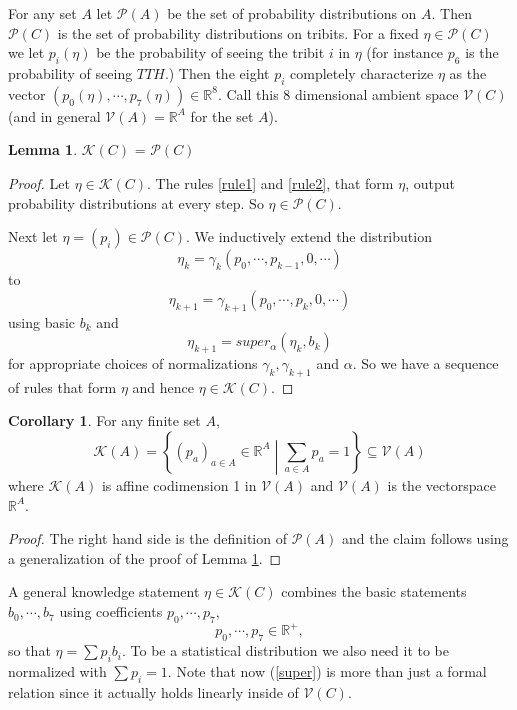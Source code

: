 \documentclass[12pt,a4paper]{article}
\theoremstyle{myrule}
\theoremstyle{postulate}
\theoremstyle{definition}
\newtheorem{corollary}{Corollary}[theorem]
\newtheorem{lemma}[theorem]{Lemma}
\begin{document}
For any set $A$ let $\mathcal{P}(A)$ be the set of probability distributions on $A$.  Then $\mathcal{P}(C)$ is the set of probability distributions on tribits. For a fixed $\eta \in \mathcal{P}(C)$ we let $p_i(\eta)$ be the probability of seeing the tribit $i$ in $\eta$ (for instance $p_\mathit{6}$ is the probability of seeing $TTH$.)  Then the eight $p_i$ completely characterize $\eta$ as the vector $(p_\mathit{0}(\eta),\cdots,p_\mathit{7}(\eta)) \in \mathbb{R}^8$.  Call this 8 dimensional ambient space $\mathcal{V}(C)$ (and in general $\mathcal{V}(A) = \mathbb{R}^A$ for the set $A$).
\begin{lemma}
\label{prob}
  $\mathcal{K}(C)$ = $\mathcal{P}(C)$
\end{lemma}
\begin{proof}
  Let $\eta \in \mathcal{K}(C)$.  The rules \ref{rule1} and \ref{rule2}, that form $\eta$, output probability distributions at every step.  So $\eta \in \mathcal{P}(C)$.
  
  Next let $\eta = (p_i) \in \mathcal{P}(C)$.  We inductively extend the distribution
  \[
  \eta_k = \gamma_k (p_0, \cdots, p_{k-1}, 0, \cdots)
  \]
  to
  \[
  \eta_{k+1} = \gamma_{k+1} (p_0, \cdots, p_{k}, 0, \cdots)
  \]
  using basic $b_k$ and 
  \[
  \eta_{k+1} = super_\alpha(\eta_k,b_k)
  \]
  for appropriate choices of normalizations $\gamma_k, \gamma_{k+1}$ and $\alpha$. So we have a sequence of rules that form $\eta$ and hence $\eta \in \mathcal{K}(C)$.
\end{proof}

\begin{corollary}
  For any finite set $A$,
  \[
  \mathcal{K}(A) = \left\{ (p_a)_{a \in A} \in \mathbb{R}^{A} \middle | \sum_{a \in A} p_a = 1 \right\}  \subseteq \mathcal{V}(A)
  \]
where $\mathcal{K}(A)$ is affine codimension 1 in $\mathcal{V}(A)$ and $\mathcal{V}(A)$ is the vectorspace $\mathbb{R}^A$.
\end{corollary}
\begin{proof}
  The right hand side is the definition of $\mathcal{P}(A)$ and the claim follows using a generalization of the proof of Lemma \ref{prob}.
\end{proof}

A general knowledge statement $\eta \in \mathcal{K}(C)$ combines the basic statements $b_\mathit{0}, \cdots, b_\mathit{7}$ using coefficients $p_\mathit{0}, \cdots, p_\mathit{7}$,
\[
  p_\mathit{0},\cdots,p_{\mathit{7}} \in \mathbb{R}^+,
\]so that $\eta = \sum p_i b_i$.  To be a statistical distribution we also need it to be normalized with $\sum p_i = 1$.  Note that now (\ref{super}) is more than just a formal relation since it actually holds linearly inside of $\mathcal{V}(C)$.
\end{document}
